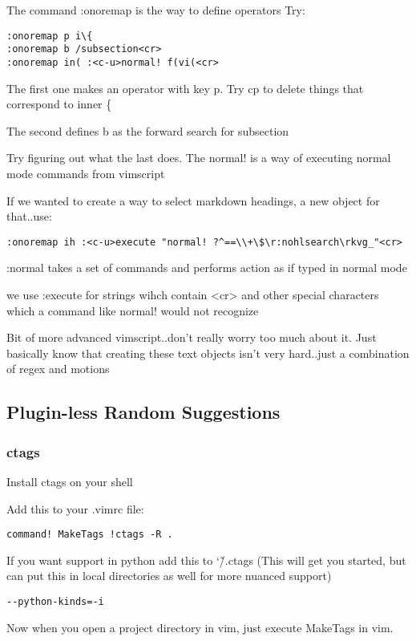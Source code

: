 \documentclass[12pt, letterpaper]{article}
\begin{document}
The command :onoremap is the way to define operators
Try:
\begin{verbatim}
:onoremap p i\{
:onoremap b /subsection<cr>
:onoremap in( :<c-u>normal! f(vi(<cr>
\end{verbatim}
The first one makes an operator with key p. Try cp to delete things that correspond to inner \{

The second defines b as the forward search for subsection

Try figuring out what the last does. The normal! is a way of executing normal mode commands from vimscript

If we wanted to create a way to select markdown headings, a new object for that..use:
\begin{verbatim}
:onoremap ih :<c-u>execute "normal! ?^==\\+\$\r:nohlsearch\rkvg_"<cr>
\end{verbatim}

:normal takes a set of commands and performs action as if typed in normal mode

we use :execute for strings wihch contain <cr> and other special characters which a command like normal! would not recognize

Bit of more advanced vimscript..don't really worry too much about it. Just basically know that creating these text objects isn't very hard..just a combination of regex and motions

\subsection{Plugin-less Random Suggestions}

\subsubsection{ctags}
Install ctags on your shell

Add this to your .vimrc file:
\begin{verbatim}
command! MakeTags !ctags -R .
\end{verbatim}

If you want support in python add this to \char`\~/.ctags (This will get you started, but can put this in local directories as well for more nuanced support)
\begin{verbatim}
--python-kinds=-i 
\end{verbatim}

Now when you open a project directory in vim, just execute MakeTags in vim.
\end{document}
